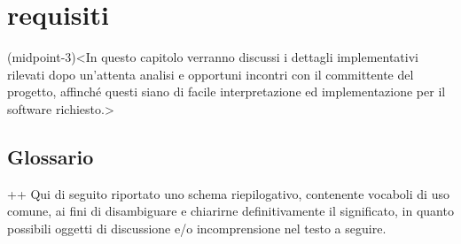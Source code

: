 \chapter[Analisi dei]{requisiti}(midpoint-3)<In questo capitolo verranno discussi i dettagli implementativi rilevati dopo un'attenta analisi e opportuni incontri con il committente del progetto, affinché questi siano di facile interpretazione ed implementazione per il software richiesto.>

\section*{Glossario}+\Alfiadoreport+
Qui di seguito riportato uno schema riepilogativo, contenente vocaboli di uso comune, ai fini di disambiguare e chiarirne definitivamente il significato, in quanto possibili oggetti di discussione e/o incomprensione nel testo a seguire.

